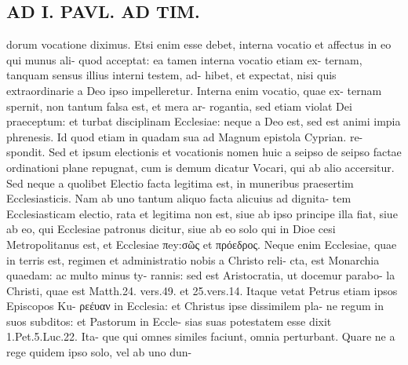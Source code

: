 \documentclass{article}
\begin{document}
\begin{pages}
\section*{AD I. PAVL. AD TIM. }
\marginpar{[ p.340 ]}dorum vocatione diximus. Etsi enim esse debet, interna vocatio et affectus in eo qui munus ali- quod acceptat: ea tamen interna vocatio etiam ex- ternam, tanquam sensus illius interni testem, ad- hibet, et expectat, nisi quis extraordinarie a Deo ipso impelleretur. Interna enim vocatio, quae ex- ternam spernit, non tantum falsa est, et mera ar- rogantia, sed etiam violat Dei praeceptum: et turbat disciplinam Ecclesiae: neque a Deo est, sed est animi impia phrenesis. Id quod etiam in quadam sua ad Magnum epistola Cyprian. re- spondit. Sed et ipsum electionis et vocationis nomen huic a seipso de seipso factae ordinationi plane repugnat, cum is demum dicatur Vocari, qui ab alio accersitur. Sed neque a quolibet Electio facta legitima est, in muneribus praesertim Ecclesiasticis. Nam ab uno tantum aliquo facta alicuius ad dignita- tem Ecclesiasticam electio, rata et legitima non est, siue ab ipso principe illa fiat, siue ab eo, qui Ecclesiae patronus dicitur, siue ab eo solo qui in Dioe cesi Metropolitanus est, et Ecclesiae πey:σῶς et πρόεδρος. Neque enim Ecclesiae, quae in terris est, regimen et administratio nobis a Christo reli- cta, est Monarchia quaedam: ac multo minus ty- rannis: sed est Aristocratia, ut docemur parabo- la Christi, quae est Matth.24. vers.49. et 25.vers.14. Itaque vetat Petrus etiam ipsos Episcopos Ku- ρεέυαν in Ecclesia: et Christus ipse dissimilem pla- ne regum in suos subditos: et Pastorum in Eccle- sias suas potestatem esse dixit 1.Pet.5.Luc.22. Ita- que qui omnes similes faciunt, omnia perturbant. Quare ne a rege quidem ipso solo, vel ab uno dun- 

\end{pages}
\end{document}
